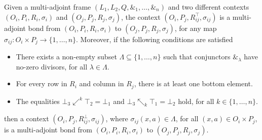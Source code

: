 \documentclass[runningheads,a4paper]{llncs}
\newcommand{\adjoint}{\mathop{\&}\nolimits}
\begin{document}
\begin{theorem}\label{th:extreme-multiadjoint-bonds}
	
Given a multi-adjoint frame $(L_1, L_2, Q, \adjoint_1, \dots, \adjoint_n)$ and two different contexts $(O_i, P_i, R_i, \sigma_i)$ and $(O_j, P_j, R_j, \sigma_j)$, the context $(O_i, P_j, R_{ij}^\top, \sigma_{ij})$ is a multi-adjoint bond from $(O_i, P_i, R_i, \sigma_i)$ to $(O_j, P_j, R_j, \sigma_j)$, for any map $\sigma_{ij} \colon O_i \times P_j \to \{1, \dots, n\}$.
Moreover, {if} the following conditions are satisfied
\begin{itemize}
    \item There exists a non-empty subset $\Lambda \subseteq \{1, \dots, n\}$ such that conjunctors $\adjoint_\lambda$ have no-zero divisors, for all $\lambda\in \Lambda$.
    \item For every row in $R_i$ and column in $R_j$, there is at least one bottom element.
    \item The equalities $\bot_3 \swarrow^k \top_2 = \bot_1$ and $\bot_3 \nwarrow_k \top_1 = \bot_2$ hold, for all $k \in \{1, \dots, n\}$.
\end{itemize}
then a context $(O_i, P_j, R_{ij}^\bot, \sigma_{ij})$, where $\sigma_{ij}(x, a) \in \Lambda$, for all $(x, a) \in O_i \times P_j$,
is a multi-adjoint bond from $(O_i, P_i, R_i, \sigma_i)$ to $(O_j, P_j, R_j, \sigma_j)$.


\end{theorem}

	
\end{document}
